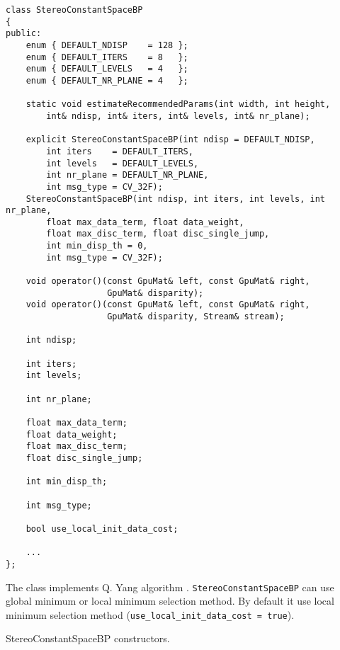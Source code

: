 \begin{lstlisting}
class StereoConstantSpaceBP
{
public:
    enum { DEFAULT_NDISP    = 128 };
    enum { DEFAULT_ITERS    = 8   };
    enum { DEFAULT_LEVELS   = 4   };
    enum { DEFAULT_NR_PLANE = 4   };

    static void estimateRecommendedParams(int width, int height, 
        int& ndisp, int& iters, int& levels, int& nr_plane);

    explicit StereoConstantSpaceBP(int ndisp = DEFAULT_NDISP,
        int iters    = DEFAULT_ITERS,
        int levels   = DEFAULT_LEVELS,
        int nr_plane = DEFAULT_NR_PLANE,
        int msg_type = CV_32F);
    StereoConstantSpaceBP(int ndisp, int iters, int levels, int nr_plane,
        float max_data_term, float data_weight, 
        float max_disc_term, float disc_single_jump,
        int min_disp_th = 0,
        int msg_type = CV_32F);

    void operator()(const GpuMat& left, const GpuMat& right, 
                    GpuMat& disparity);
    void operator()(const GpuMat& left, const GpuMat& right, 
                    GpuMat& disparity, Stream& stream);

    int ndisp;

    int iters;
    int levels;

    int nr_plane;

    float max_data_term;
    float data_weight;
    float max_disc_term;
    float disc_single_jump;

    int min_disp_th;

    int msg_type;

    bool use_local_init_data_cost;
    
    ...
};
\end{lstlisting}

The class implements Q. Yang algorithm \cite{qx_csbp}. \texttt{StereoConstantSpaceBP} can use global minimum or local minimum selection method. By default it use local minimum selection method (\texttt{use\_local\_init\_data\_cost = true}).


StereoConstantSpaceBP constructors.


